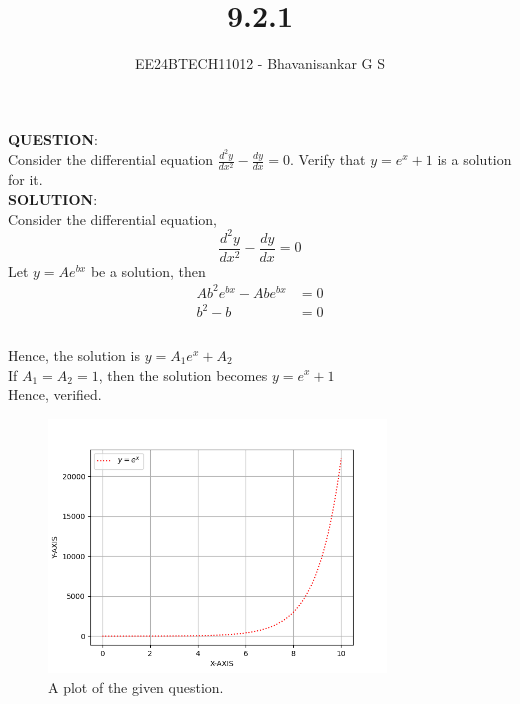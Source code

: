 \documentclass[journal]{IEEEtran}
\begin{document}

\vspace{3cm}

\title{9.2.1}
\author{EE24BTECH11012 - Bhavanisankar G S}
{\let\newpage\relax\maketitle}

\renewcommand{\thefigure}{\theenumi}
\renewcommand{\thetable}{\theenumi}
\setlength{\intextsep}{10pt} %


\renewcommand{\thetable}{\theenumi}

\textbf{QUESTION}:\\
Consider the differential equation $\frac{d^2 y}{d x^2} - \frac{dy}{dx} = 0$. Verify that $y = e^x + 1$ is a solution for it. \\
\textbf{SOLUTION}: \\
Consider the differential equation, 
$$ \frac{d^2 y}{d x^2} - \frac{dy}{dx} = 0 $$
Let $y = Ae^{bx}$ be a solution, then \\
\begin{align}
	Ab^2 e^{bx} - Ab e^{bx} &= 0 \\
	b^2 - b &= 0 \\
	\end{align}
   \\
Hence, the solution is $y = A_1 e^{x} + A_2 $ \\
If $A_1 = A_2 = 1$, then the solution becomes $y = e^x + 1$ \\
Hence, verified.

\begin{figure}[h]
				 \centering
				 \includegraphics[width=0.8\textwidth]{figs/fig.png}
				 \caption{A plot of the given question.}
				 \label{fig:Plot1}
			 \end{figure}
\end{document}
